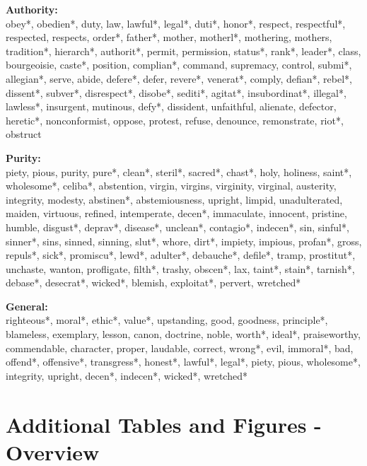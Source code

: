 \documentclass[12pt]{article}
\begin{document}
\textbf{Authority:}\\
obey*, obedien*, duty, law, lawful*, legal*, duti*, honor*, respect, respectful*, respected, respects, order*, father*, mother, motherl*, mothering, mothers, tradition*, hierarch*, authorit*, permit, permission, status*, rank*, leader*, class, bourgeoisie, caste*, position, complian*, command, supremacy, control, submi*, allegian*, serve, abide, defere*, defer, revere*, venerat*, comply, defian*, rebel*, dissent*, subver*, disrespect*, disobe*, sediti*, agitat*, insubordinat*, illegal*, lawless*, insurgent, mutinous, defy*, dissident, unfaithful, alienate, defector, heretic*, nonconformist, oppose, protest, refuse, denounce, remonstrate, riot*, obstruct
\vspace{.5cm}

\textbf{Purity:}\\
piety, pious, purity, pure*, clean*, steril*, sacred*, chast*, holy, holiness, saint*, wholesome*, celiba*, abstention, virgin, virgins, virginity, virginal, austerity, integrity, modesty, abstinen*, abstemiousness, upright, limpid, unadulterated, maiden, virtuous, refined, intemperate, decen*, immaculate, innocent, pristine, humble, disgust*, deprav*, disease*, unclean*, contagio*, indecen*, sin, sinful*, sinner*, sins, sinned, sinning, slut*, whore, dirt*, impiety, impious, profan*, gross, repuls*, sick*, promiscu*, lewd*, adulter*, debauche*, defile*, tramp, prostitut*, unchaste, wanton, profligate, filth*, trashy, obscen*, lax, taint*, stain*, tarnish*, debase*, desecrat*, wicked*, blemish, exploitat*, pervert, wretched*
\vspace{.5cm}

\textbf{General:}\\
righteous*, moral*, ethic*, value*, upstanding, good, goodness, principle*, blameless, exemplary, lesson, canon, doctrine, noble, worth*, ideal*, praiseworthy, commendable, character, proper, laudable, correct, wrong*, evil, immoral*, bad, offend*, offensive*, transgress*, honest*, lawful*, legal*, piety, pious, wholesome*, integrity, upright, decen*, indecen*, wicked*, wretched*


\clearpage
\section{Additional Tables and Figures - Overview}
\renewcommand\thefigure{\thesection.\arabic{figure}}
\renewcommand\thetable{\thesection.\arabic{table}}
\setcounter{figure}{0}
\setcounter{table}{0}
\end{document}
